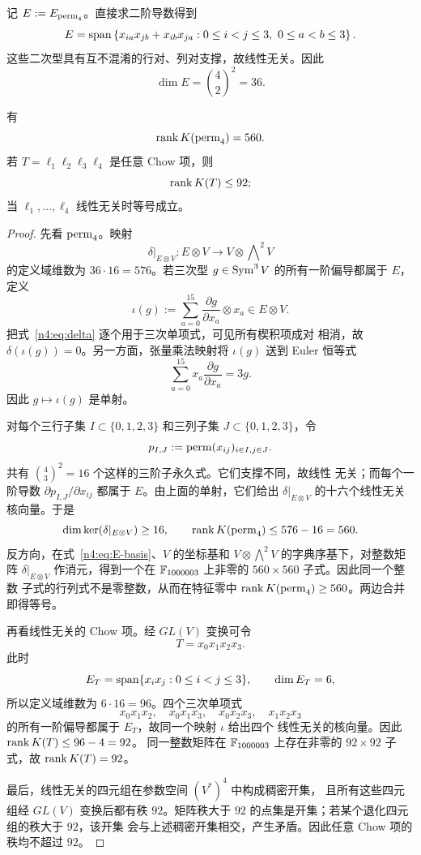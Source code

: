 记 \(E:=E_{\operatorname{perm}_4}\)。直接求二阶导数得到
\begin{equation}\label{n4:eq:E-basis}
  E=\operatorname{span}\left\{
    x_{ia}x_{jb}+x_{ib}x_{ja}:
    0\leq i<j\leq3,\ 0\leq a<b\leq3
  \right\}.
\end{equation}
这些二次型具有互不混淆的行对、列对支撑，故线性无关。因此
\[
  \dim E=\binom42^2=36.
\]

\begin{proposition}\label{n4:prop:base-ranks}
有
\[
  \operatorname{rank} K(\operatorname{perm}_4)=560.
\]
若 \(T=\ell_1\ell_2\ell_3\ell_4\) 是任意 Chow 项，则
\[
  \operatorname{rank} K(T)\leq92;
\]
当 \(\ell_1,\ldots,\ell_4\) 线性无关时等号成立。
\end{proposition}

\begin{proof}
先看 \(\operatorname{perm}_4\)。映射
\[
  \left.\delta\right|_{E\otimes V}:E\otimes V\longrightarrow
  V\otimes\bigwedge\nolimits^2V
\]
的定义域维数为 \(36\cdot16=576\)。若三次型 \(g\in\operatorname{Sym}^3V\)
的所有一阶偏导都属于 \(E\)，定义
\[
  \iota(g):=\sum_{a=0}^{15}
  \frac{\partial g}{\partial x_a}\otimes x_a\in E\otimes V.
\]
把式~\eqref{n4:eq:delta} 逐个用于三次单项式，可见所有楔积项成对
相消，故 \(\delta(\iota(g))=0\)。另一方面，张量乘法映射将
\(\iota(g)\) 送到 Euler 恒等式
\[
  \sum_{a=0}^{15}x_a\frac{\partial g}{\partial x_a}=3g.
\]
因此 \(g\mapsto\iota(g)\) 是单射。

对每个三行子集
\(I\subset\{0,1,2,3\}\) 和三列子集 \(J\subset\{0,1,2,3\}\)，令
\[
  p_{I,J}:=\operatorname{perm}(x_{ij})_{i\in I,j\in J}.
\]
共有 \(\binom43^2=16\) 个这样的三阶子永久式。它们支撑不同，故线性
无关；而每个一阶导数 \(\partial p_{I,J}/\partial x_{ij}\) 都属于
\(E\)。由上面的单射，它们给出
\(\delta|_{E\otimes V}\) 的十六个线性无关核向量。于是
\[
  \dim\ker(\delta|_{E\otimes V})\geq16,\qquad
  \operatorname{rank} K(\operatorname{perm}_4)\leq576-16=560.
\]
反方向，在式~\eqref{n4:eq:E-basis}、\(V\) 的坐标基和
\(V\otimes\bigwedge^2V\) 的字典序基下，对整数矩阵
\(\delta|_{E\otimes V}\) 作消元，得到一个在
\(\mathbb F_{1000003}\) 上非零的 \(560\times560\) 子式。因此同一个整数
子式的行列式不是零整数，从而在特征零中
\(\operatorname{rank} K(\operatorname{perm}_4)\geq560\)。两边合并即得等号。

再看线性无关的 Chow 项。经 \(GL(V)\) 变换可令
\[
  T=x_0x_1x_2x_3.
\]
此时
\[
  E_T=\operatorname{span}\{x_ix_j:0\leq i<j\leq3\},\qquad \dim E_T=6,
\]
所以定义域维数为 \(6\cdot16=96\)。四个三次单项式
\[
  x_0x_1x_2,\quad x_0x_1x_3,\quad
  x_0x_2x_3,\quad x_1x_2x_3
\]
的所有一阶偏导都属于 \(E_T\)，故同一个映射 \(\iota\) 给出四个
线性无关的核向量。因此 \(\operatorname{rank} K(T)\leq96-4=92\)。
同一整数矩阵在 \(\mathbb F_{1000003}\) 上存在非零的 \(92\times92\)
子式，故 \(\operatorname{rank} K(T)=92\)。

最后，线性无关的四元组在参数空间 \((V^*)^4\) 中构成稠密开集，
且所有这些四元组经 \(GL(V)\) 变换后都有秩 \(92\)。矩阵秩大于
\(92\) 的点集是开集；若某个退化四元组的秩大于 \(92\)，该开集
会与上述稠密开集相交，产生矛盾。因此任意 Chow 项的秩均不超过
\(92\)。
\end{proof}


